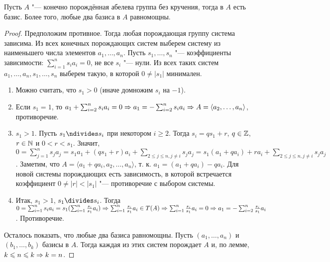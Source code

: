 \documentclass[main]{subfiles}
\begin{document}
\begin{theorem}
  Пусть \( A \) "--- конечно порождённая абелева группа без кручения,
  тогда в \( A \) есть базис.
  Более того, любые два базиса в \( A \) равномощны.
\end{theorem}
\begin{proof}
  Предположим противное.
  Тогда любая порождающая группу система зависима.
  Из всех конечных порождающих систем выберем
  систему из наименьшего числа элементов
  \( a_1, \dots, a_n \).
  Пусть \( s_1, \dots, s_n \) "--- коэффициенты зависимости:
  \( \sum_{i = 1}^n s_i a_i = 0 \), не все \( s_i \) "--- нули.
  Из всех таких систем \( a_1, \dots, a_n, s_1, \dots, s_n \)
  выберем такую, в которой \( 0 \ne |s_1| \) минимален.

  \begin{enumerate}
    \item Можно считать, что \( s_1 > 0 \)
      (иначе домножим \( s_i \) на \( -1 \)).
    \item Если \( s_1 = 1 \), то
      \( a_1 + \sum_{i = 2}^n s_i a_i = 0 \Rightarrow
      a_1 = -\sum_{i = 2}^n s_i a_i \Rightarrow
      A = \langle a_2, \dots, a_n \rangle \),
      противоречие.
    \item \( s_1 > 1 \). Пусть \( s_1 \ndivides s_i \)
      при некотором \( i \ge 2 \).
      Тогда \( s_i = q s_1 + r \), \( q \in \mathbb{Z} \),
      \( r \in \mathbb{N} \)
      и \( 0 < r < s_1 \).
      Значит, \( 0 = \sum_{j = 1}^n s_j a_j =
      s_1 a_1 + (q s_1 + r) a_i +
      \sum_{2 \le j \le n, j \ne i} s_j a_j =
      s_1(a_1 + q a_i) + r a_i  +
      \sum_{2 \le j \le n, j \ne i} s_j a_j \).
      Заметим, что \( A = \langle a_1 + q a_i, a_2, \dots, a_n \rangle \),
      т. к. \( a_1 = (a_1 + q a_i) - q a_i \).
      Для новой системы порождающих есть зависимость,
      в которой встречается коэффициент \( 0 \ne |r| < |s_1| \) "---
      противоречие с выбором системы.
    \item Итак, \( s_1 > 1 \), \( s_1 \divides s_i \).
      Тогда \( 0 = \sum_{i = 1}^n s_i a_i =
      s_1 (\sum_{i = 1}^n \frac{s_i}{s_1} a_i) \Rightarrow
      \sum_{i = 1}^n \frac{s_i}{s_1} a_i \in T(A) \Rightarrow
      \sum_{i = 1}^n \frac{s_i}{s_1} a_i = 0 \Rightarrow
      a_1 = -\sum_{i = 2}^n \frac{s_i}{s_1} a_i \).
      Противоречие.
  \end{enumerate}

  Осталось показать, что любые два базиса равномощны.
  Пусть \( (a_1, \dots, a_n) \) и \( (b_1, \dots, b_k) \)
  базисы в \( A \). Тогда каждая из этих систем
  порождает \( A \) и, по лемме,
  \( k \leqslant n \leqslant k \Rightarrow k = n \).
\end{proof}
\end{document}
